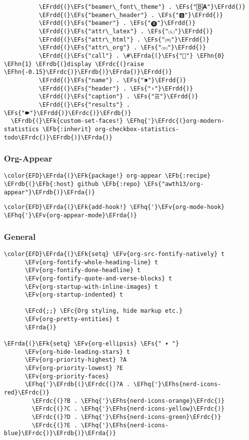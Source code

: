 \documentclass[12pt]{article}
\theoremstyle{plain}%
\theoremstyle{definition}
\theoremstyle{remark}
\newcommand{\EFc}[1]{\textcolor{EFc}{#1}} %
\newcommand{\EFcd}[1]{\textcolor{EFcd}{#1}} %
\newcommand{\EFs}[1]{\textcolor{EFs}{#1}} %
\newcommand{\EFk}[1]{\textcolor{EFk}{#1}} %
\newcommand{\EFb}[1]{\textcolor{EFb}{#1}} %
\newcommand{\EFv}[1]{\textcolor{EFv}{#1}} %
\newcommand{\EFhn}[1]{\textcolor{EFhn}{\textbf{#1}}} %
\newcommand{\EFhq}[1]{\textcolor{EFhq}{#1}} %
\newcommand{\EFhs}[1]{\textcolor{EFhs}{#1}} %
\newcommand{\EFrda}[1]{\textcolor{EFrda}{#1}} %
\newcommand{\EFrdb}[1]{\textcolor{EFrdb}{#1}} %
\newcommand{\EFrdc}[1]{\textcolor{EFrdc}{#1}} %
\newcommand{\EFrdd}[1]{\textcolor{EFrdd}{#1}} %
\begin{document}
\begin{Code}
\begin{Verbatim}
          \EFrdd{(}\EFs{"beamer\_font\_theme"} . \EFs{"🄱𝐀"}\EFrdd{)}
          \EFrdd{(}\EFs{"beamer\_header"} . \EFs{"🅱"}\EFrdd{)}
          \EFrdd{(}\EFs{"beamer"} . \EFs{"🅑"}\EFrdd{)}
          \EFrdd{(}\EFs{"attr\_latex"} . \EFs{"🄛"}\EFrdd{)}
          \EFrdd{(}\EFs{"attr\_html"} . \EFs{"🄗"}\EFrdd{)}
          \EFrdd{(}\EFs{"attr\_org"} . \EFs{"⒪"}\EFrdd{)}
          \EFrdd{(}\EFs{"call"} . \#\EFrda{(}\EFs{""} \EFhn{0} \EFhn{1} \EFrdb{(}display \EFrdc{(}raise \EFhn{-0.15}\EFrdc{)}\EFrdb{)}\EFrda{)}\EFrdd{)}
          \EFrdd{(}\EFs{"name"} . \EFs{"⁍"}\EFrdd{)}
          \EFrdd{(}\EFs{"header"} . \EFs{"›"}\EFrdd{)}
          \EFrdd{(}\EFs{"caption"} . \EFs{"☰"}\EFrdd{)}
          \EFrdd{(}\EFs{"results"} . \EFs{"🠶"}\EFrdd{)}\EFrdc{)}\EFrdb{)}
  \EFrdb{(}\EFk{custom-set-faces!} \EFhq{'}\EFrdc{(}org-modern-statistics \EFb{:inherit} org-checkbox-statistics-todo\EFrdc{)}\EFrdb{)}\EFrda{)}
\end{Verbatim}
\end{Code}
\subsubsection{Org-Appear}
\label{sec:org4cdfcc6}
\begin{Code}
\begin{Verbatim}
\color{EFD}\EFrda{(}\EFk{package!} org-appear \EFb{:recipe} \EFrdb{(}\EFb{:host} github \EFb{:repo} \EFs{"awth13/org-appear"}\EFrdb{)}\EFrda{)}
\end{Verbatim}
\end{Code}
\begin{Code}
\begin{Verbatim}
\color{EFD}\EFrda{(}\EFk{add-hook!} \EFhq{'}\EFv{org-mode-hook} \EFhq{'}\EFv{org-appear-mode}\EFrda{)}
\end{Verbatim}
\end{Code}
\subsubsection{General}
\label{sec:org95d43c6}
\begin{Code}
\begin{Verbatim}
\color{EFD}\EFrda{(}\EFk{setq} \EFv{org-src-fontify-natively} t
      \EFv{org-fontify-whole-heading-line} t
      \EFv{org-fontify-done-headline} t
      \EFv{org-fontify-quote-and-verse-blocks} t
      \EFv{org-startup-with-inline-images} t
      \EFv{org-startup-indented} t

      \EFcd{;;} \EFc{Org styling, hide markup etc.}
      \EFv{org-pretty-entities} t
      \EFrda{)}

\EFrda{(}\EFk{setq} \EFv{org-ellipsis} \EFs{" ▾ "}
      \EFv{org-hide-leading-stars} t
      \EFv{org-priority-highest} ?A
      \EFv{org-priority-lowest} ?E
      \EFv{org-priority-faces}
      \EFhq{'}\EFrdb{(}\EFrdc{(}?A . \EFhq{'}\EFhs{nerd-icons-red}\EFrdc{)}
        \EFrdc{(}?B . \EFhq{'}\EFhs{nerd-icons-orange}\EFrdc{)}
        \EFrdc{(}?C . \EFhq{'}\EFhs{nerd-icons-yellow}\EFrdc{)}
        \EFrdc{(}?D . \EFhq{'}\EFhs{nerd-icons-green}\EFrdc{)}
        \EFrdc{(}?E . \EFhq{'}\EFhs{nerd-icons-blue}\EFrdc{)}\EFrdb{)}\EFrda{)}
\end{Verbatim}
\end{Code}
\end{document}
